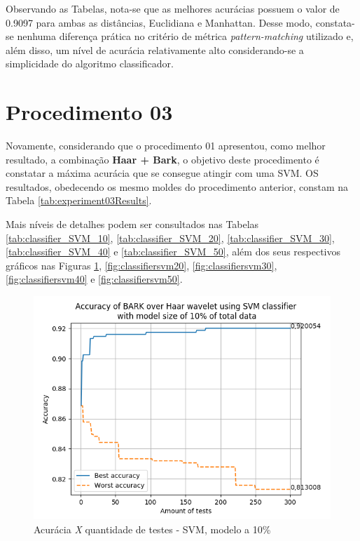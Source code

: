 	        Observando as Tabelas, nota-se que as melhores acurácias possuem o valor de 0.9097 para ambas as distâncias, Euclidiana e Manhattan.  Desse modo, constata-se nenhuma diferença prática no critério de métrica \textit{pattern-matching} utilizado e, além disso, um nível de acurácia relativamente alto considerando-se a simplicidade do algoritmo classificador.
	
		\section{Procedimento 03}
		\label{chap:testsResults:sec:Experimento03}
			\par Novamente, considerando que o procedimento 01 apresentou, como melhor resultado, a combinação \textbf{Haar + Bark}, o objetivo deste procedimento é constatar a máxima acurácia que se consegue atingir com uma SVM. OS resultados, obedecendo os mesmo moldes do procedimento anterior, constam na Tabela \ref{tab:experiment03Results}. 
			
			\par Mais níveis de detalhes podem ser consultados nas Tabelas \ref{tab:classifier_SVM_10}, \ref{tab:classifier_SVM_20}, \ref{tab:classifier_SVM_30}, \ref{tab:classifier_SVM_40} e  \ref{tab:classifier_SVM_50}, além dos seus respectivos gráficos nas Figuras \ref{fig:classifiersvm10}, \ref{fig:classifiersvm20}, \ref{fig:classifiersvm30}, \ref{fig:classifiersvm40} e \ref{fig:classifiersvm50}.
	
			
		
		    \begin{figure}
			\centering
			\includegraphics{images/results/confusionMatrices/classifier_SVM_10.png}
			\caption{Acurácia \textit{X} quantidade de testes - SVM, modelo a 10\%}
			\label{fig:classifiersvm10}
		\end{figure}
		
	

